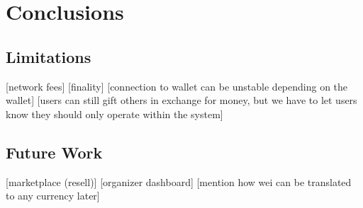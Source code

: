 \chapter{Conclusions}
\label{ch:conclusions}

\section{Limitations}
 [network fees]
 [finality]
 [connection to wallet can be unstable depending on the wallet]
 [users can still gift others in exchange for money, but we have to let users know they should only operate within the system]

\section{Future Work}

 [marketplace (resell)]
 [organizer dashboard]
 [mention how wei can be translated to any currency later]